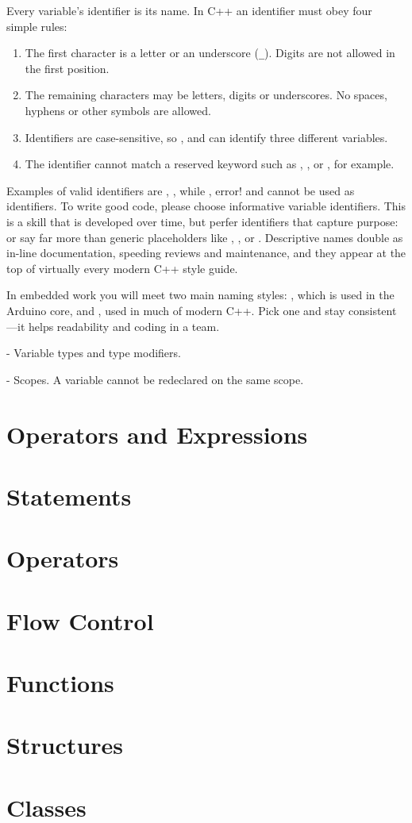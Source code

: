 Every variable's identifier is its name.
In C++ an identifier must obey four simple rules:

\begin{enumerate}
  \item 
  The first character is a letter or an underscore (\texttt{\_}).
  Digits are not allowed in the first position.
  \item 
  The remaining characters may be letters, digits or underscores.
  No spaces, hyphens or other symbols are allowed.
  \item 
  Identifiers are case-sensitive, so ,  and  can identify three different variables.
  \item 
  The identifier cannot match a reserved keyword such as , , or , for example.
\end{enumerate}

Examples of valid identifiers are , , while , {error!} and  cannot be used as identifiers.
To write good code, please choose informative variable identifiers.
This is a skill that is developed over time, but perfer identifiers that capture purpose:  or  say far more than generic placeholders like , , or .
Descriptive names double as in-line documentation, speeding reviews and maintenance, and they appear at the top of virtually every modern C++ style guide.

In embedded work you will meet two main naming styles: , which is used in the Arduino core, and , used in much of modern C++. 
Pick one and stay consistent---it helps readability and coding in a team.

- Variable types and type modifiers.

- Scopes.
A variable cannot be redeclared on the same scope.

\section{Operators and Expressions}

\section{Statements}
\section{Operators}
\section{Flow Control}
\section{Functions}
\section{Structures}
\section{Classes}


